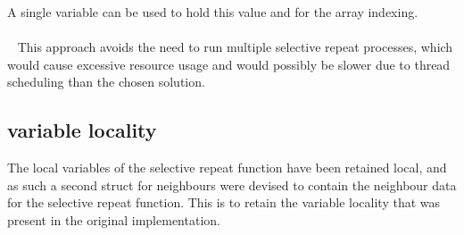 A single variable can be used to hold this value and for the array indexing.\\
\\~
This approach avoids the need to run multiple selective repeat processes, which would cause excessive resource usage and would possibly be slower due to thread scheduling than the chosen solution.

\subsection{variable locality}
The local variables of the selective repeat function have been retained local, and as such a second struct for neighbours were devised to contain the neighbour data for the selective repeat function. This is to retain the variable locality that was present in the original implementation.

















